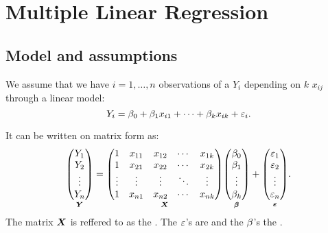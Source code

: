 \section{Multiple Linear Regression}
\subsection{Model and assumptions}

We assume that we have $i=1,\dots,n$ observations of a  $Y_i$ depending on $k$  $x_{ij}$ through a linear model:
$$
    Y_i = \beta_0 + \beta_1 x_{i1} + \dots + \beta_k x_{ik} + \varepsilon_i.
$$

It can be written on matrix form as:
$$
    \underset{\boldsymbol{Y}}{
    \begin{pmatrix}
        Y_1 \\
        Y_2 \\
        \vdots \\
        Y_n
    \end{pmatrix}}
    =
    \underset{\boldsymbol{X}}{
    \begin{pmatrix}
        1 & x_{11} & x_{12} & \cdots & x_{1k} \\
        1 & x_{21} & x_{22} & \cdots & x_{2k} \\
        \vdots & \vdots & \vdots & \ddots & \vdots \\
        1 & x_{n1} & x_{n2} & \cdots & x_{nk}
    \end{pmatrix}}
    \underset{\boldsymbol{\beta}}{
    \begin{pmatrix}
        \beta_0 \\
        \beta_1 \\
        \vdots \\
        \beta_k
    \end{pmatrix}}
    +
    \underset{\boldsymbol{\varepsilon}}{
    \begin{pmatrix}
        \varepsilon_1 \\
        \varepsilon_2 \\
        \vdots \\
        \varepsilon_n
    \end{pmatrix}}.
$$
The matrix $\boldsymbol{X}$ is reffered to as the . The $\varepsilon$'s are  and the $\beta$'s the .
